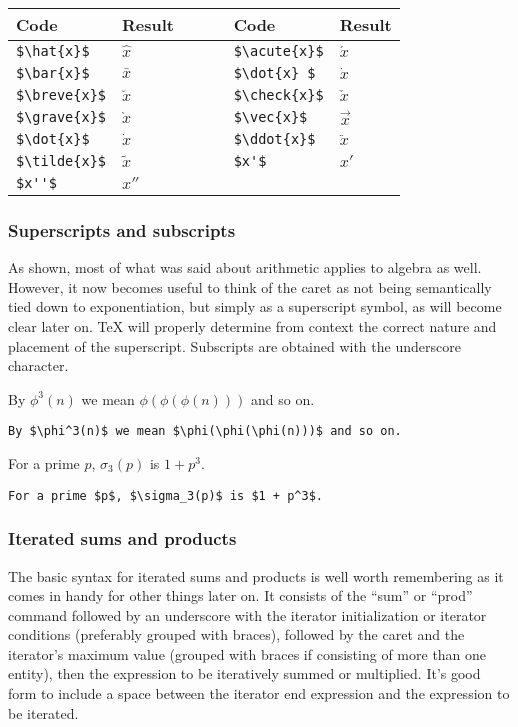 \medskip

\begin{tabular}{l l c l l}
\textbf{Code} & \textbf{Result} &~~~& \textbf{Code} & \textbf{Result}\\
\hline
\verb"$\hat{x}$"  & $\hat{x}$ &&
\verb"$\acute{x}$" & $\acute{x}$ \\
\verb"$\bar{x}$ " & $\bar{x}$ &&
\verb"$\dot{x} $" & $\dot{x} $ \\
\verb"$\breve{x}$" & $\breve{x}$ &&
\verb"$\check{x}$" & $\check{x}$  \\
\verb"$\grave{x}$" & $\grave{x}$ && 
\verb"$\vec{x}$" & $\vec{x}$ \\
\verb"$\dot{x}$" & $\dot{x}$ &&
\verb"$\ddot{x}$" & $\ddot{x}$ \\         
\verb"$\tilde{x}$" & $\tilde{x}$ &&
\verb"$x'$" & $x'$ \\
\verb"$x''$" & $x''$
\end{tabular}

\subsubsection{Superscripts and subscripts}

As shown, most of what was said about arithmetic applies to algebra as well. However, it now becomes useful to think of the caret as not being semantically tied down to exponentiation, but simply as a superscript symbol, as will become clear later on. \TeX{} will properly determine from context the correct nature and placement of the superscript. Subscripts are obtained with the underscore character.

\medskip

By $\phi^3(n)$ we mean $\phi(\phi(\phi(n)))$ and so on.

\smallskip

\verb'By $\phi^3(n)$ we mean $\phi(\phi(\phi(n)))$ and so on.'

\medskip

For a prime $p$, $\sigma_3(p)$ is $1 + p^3$.

\smallskip

\verb'For a prime $p$, $\sigma_3(p)$ is $1 + p^3$.'

\bigskip

\subsubsection{Iterated sums and products}

The basic syntax for iterated sums and products is well worth remembering as it comes in handy for other things later on. It consists of the ``sum'' or ``prod'' command followed by an underscore with the iterator initialization or iterator conditions (preferably grouped with braces), followed by the caret and the iterator's maximum value (grouped with braces if consisting of more than one entity), then the expression to be iteratively summed or multiplied. It's good form to include a space between the iterator end expression and the expression to be iterated.

